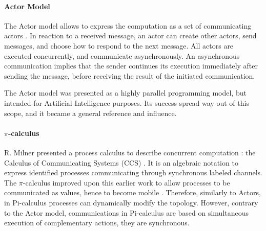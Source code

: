 \paragraph{Actor Model}

The Actor model allows to express the computation as a set of communicating actors \cite{Hewitt1973a, Hewitt1977, Clinger1981}.
In reaction to a received message, an actor can create other actors, send messages, and choose how to respond to the next message.
All actors are executed concurrently, and communicate asynchronously.
An asynchronous communication implies that the sender continues its execution immediately after sending the message, before receiving the result of the initiated communication.

The Actor model was presented as a highly parallel programming model, but intended for Artificial Intelligence purposes.
Its success spread way out of this scope, and it became a general reference and influence.


\paragraph{$\pi$-calculus}

R. Milner presented a process calculus to describe concurrent computation : the Calculus of Communicating Systems (CCS) \cite{Milner1975, Milner1980}.
It is an algebraic notation to express identified processes communicating through synchronous labeled channels.
The $\pi$-calculus improved upon this earlier work to allow processes to be communicated as values, hence to become mobile \cite{Engberg1986,Milner1992a,Milner1992}.
Therefore, similarly to Actors, in Pi-calculus processes can dynamically modify the topology.
However, contrary to the Actor model, communications in Pi-calculus are based on simultaneous execution of complementary actions, they are synchronous.



